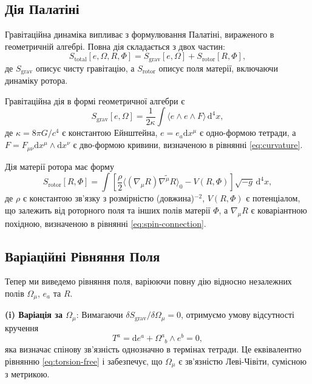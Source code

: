 \documentclass[11pt,a4paper]{article}
\numberwithin{equation}{section}
\theoremstyle{plain}
\theoremstyle{definition}
\theoremstyle{remark}
\newcommand{\dd}{\mathrm{d}}
\begin{document}
\subsection{Дія Палатіні}

Гравітаційна динаміка випливає з формулювання Палатіні, вираженого в геометричній алгебрі. Повна дія складається з двох частин:
\begin{equation}
S_{\mathrm{total}}[e,\Omega,R,\Phi] = S_{\mathrm{grav}}[e,\Omega] + S_{\mathrm{rotor}}[R,\Phi],
\label{eq:action}
\end{equation}
де $S_{\mathrm{grav}}$ описує чисту гравітацію, а $S_{\mathrm{rotor}}$ описує поля матерії, включаючи динаміку ротора.

Гравітаційна дія в формі геометричної алгебри є
\begin{equation}
S_{\mathrm{grav}}[e,\Omega] = \frac{1}{2\kappa} \int \langle e \wedge e \wedge F \rangle \, \dd^4x,
\label{eq:palatini-action}
\end{equation}
де $\kappa = 8\pi G/c^4$ є константою Ейнштейна, $e = e_a \dd x^\mu$ є одно-формою тетради, а $F = F_{\mu\nu} \dd x^\mu \wedge \dd x^\nu$ є дво-формою кривини, визначеною в рівнянні \eqref{eq:curvature}.

Дія матерії ротора має форму
\begin{equation}
S_{\mathrm{rotor}}[R,\Phi] = \int \left[\frac{\rho}{2}\langle (\nabla_\mu R)\widetilde{\nabla^\mu R} \rangle_0 - V(R,\Phi)\right] \sqrt{-g}\, \dd^4x,
\label{eq:rotor-action}
\end{equation}
де $\rho$ є константою зв'язку з розмірністю (довжина)$^{-2}$, $V(R,\Phi)$ є потенціалом, що залежить від роторного поля та інших полів матерії $\Phi$, а $\nabla_\mu R$ є коваріантною похідною, визначеною в рівнянні \eqref{eq:spin-connection}.

\subsection{Варіаційні Рівняння Поля}

Тепер ми виведемо рівняння поля, варіюючи повну дію відносно незалежних полів $\Omega_\mu$, $e_a$ та $R$.

\textbf{(i) Варіація за $\Omega_\mu$}: Вимагаючи $\delta S_{\mathrm{grav}}/\delta \Omega_\mu = 0$, отримуємо умову відсутності кручення
\begin{equation}
T^a = \dd e^a + \Omega^a_{\phantom{a}b} \wedge e^b = 0,
\label{eq:field-torsion}
\end{equation}
яка визначає спінову зв'язність однозначно в термінах тетради. Це еквівалентно рівнянню \eqref{eq:torsion-free} і забезпечує, що $\Omega_\mu$ є зв'язністю Леві-Чівіти, сумісною з метрикою.
\end{document}
